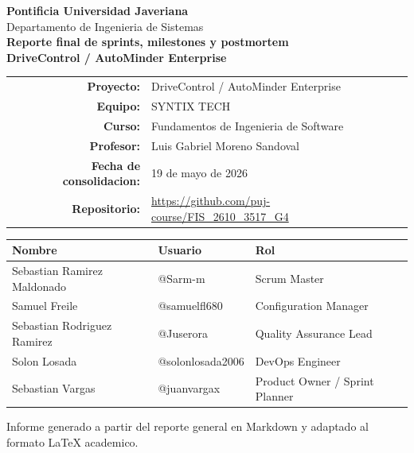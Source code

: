 \documentclass[11pt,a4paper]{article}
\begin{document}
\hypersetup{pageanchor=false}
\begin{titlepage}
\centering
\vspace*{1.2cm}
{\Large \textbf{Pontificia Universidad Javeriana}}\\[0.4em]
{\large Departamento de Ingenieria de Sistemas}\\[2.4cm]

{\Huge \textbf{Reporte final de sprints, milestones y postmortem}}\\[0.7em]
{\Large \textbf{DriveControl / AutoMinder Enterprise}}\\[1.2cm]

\begin{tabular}{rl}
\textbf{Proyecto:} & DriveControl / AutoMinder Enterprise \\
\textbf{Equipo:} & SYNTIX TECH \\
\textbf{Curso:} & Fundamentos de Ingenieria de Software \\
\textbf{Profesor:} & Luis Gabriel Moreno Sandoval \\
\textbf{Fecha de consolidacion:} & 19 de mayo de 2026 \\
\textbf{Repositorio:} & \url{https://github.com/puj-course/FIS_2610_3517_G4} \\
\end{tabular}

\vfill

\begin{tabular}{lll}
\toprule
\textbf{Nombre} & \textbf{Usuario} & \textbf{Rol} \\
\midrule
Sebastian Ramirez Maldonado & @Sarm-m & Scrum Master \\
Samuel Freile & @samuelfl680 & Configuration Manager \\
Sebastian Rodriguez Ramirez & @Juserora & Quality Assurance Lead \\
Solon Losada & @solonlosada2006 & DevOps Engineer \\
Sebastian Vargas & @juanvargax & Product Owner / Sprint Planner \\
\bottomrule
\end{tabular}

\vfill
{\small Informe generado a partir del reporte general en Markdown y adaptado al formato LaTeX academico.}
\end{titlepage}
\hypersetup{pageanchor=true}

\tableofcontents
\clearpage
\end{document}
